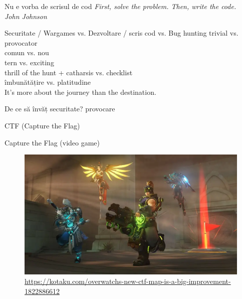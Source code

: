 \documentclass{simple}
\begin{document}
\begin{frame}{Nu e vorba de scrisul de cod}
  \centering
  \pause
  \textit{First, solve the problem. Then, write the code.} \\
  \vspace{3mm}
  \hfill \textit{John Johnson} \\
\end{frame}

\begin{frame}{Securitate / Wargames vs. Dezvoltare / scris cod vs. Bug hunting}
  \centering
  \pause
  \vspace{0.5cm}
  \Large{trivial vs. provocator} \\
  \pause
  \vspace{0.5cm}
  \Large{comun vs. nou} \\
  \pause
  \vspace{0.5cm}
  \Large{tern vs. exciting} \\
  \pause
  \vspace{0.5cm}
  \Large{thrill of the hunt + catharsis vs. checklist} \\
  \pause
  \vspace{0.5cm}
  \Large{îmbunătățire vs. platitudine} \\
  \pause
  \vspace{0.5cm}
  \Large{It's more about the journey than the destination.}
\end{frame}

\begin{frame}{De ce să învăț securitate?}
  \centering
  \pause
  \vspace{0.5cm}
  \Large{provocare} \\
\end{frame}

\begin{frame}{}
  \centering
  \LARGE
  CTF (Capture the Flag)
\end{frame}

\begin{frame}{Capture the Flag (video game)}
  \begin{figure}[!htbp]
    \centering
    \includegraphics[width=\textwidth]{img/overwatch-ctf.png} \\
    \tiny{\url{https://kotaku.com/overwatchs-new-ctf-map-is-a-big-improvement-1822886612}}
  \end{figure}
\end{frame}
\end{document}
